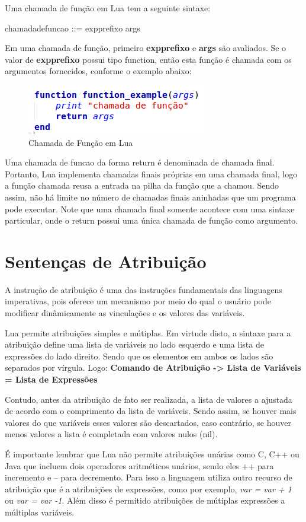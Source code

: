 \documentclass[
12pt, %
openright, %
oneside, %
a4paper, %
english, %
brazil, %
]{abntex2}
\begin{document}
Uma chamada de função em Lua tem a seguinte sintaxe:

  chamadadefuncao ::= expprefixo args

Em uma chamada de função, primeiro \textbf{expprefixo} e \textbf{args} são avaliados. Se o valor de \textbf{expprefixo} possui tipo function, então esta função é chamada com os argumentos fornecidos, conforme o exemplo abaixo:

\begin{figure}[H]
\centering
\includegraphics[width=0.5\linewidth]{imagens/function.png}
\caption{Chamada de Função em Lua}
\end{figure}

Uma chamada de funcao da forma return é denominada de chamada final. Portanto, Lua implementa chamadas finais próprias em uma chamada final, logo a função chamada reusa a entrada na pilha da função que a chamou. Sendo assim, não há limite no número de chamadas finais aninhadas que um programa pode executar. Note que uma chamada final somente acontece com uma sintaxe particular, onde o return possui uma única chamada de função como argumento.

\chapter{Sentenças de Atribuição}
A instrução de atribuição é uma das instruções fundamentais das linguagens imperativas, pois oferece um mecanismo por meio do qual o usuário pode modificar dinâmicamente as vinculações e os valores das variáveis.

Lua permite atribuições simples e mútiplas. Em virtude disto, a sintaxe para a atribuição define uma lista de variáveis no lado esquerdo e uma lista de expressões do lado direito. Sendo que os elementos em ambos os lados são separados por vírgula. Logo:
\textbf{Comando de Atribuição -> Lista de Variáveis = Lista de Expressões}

Contudo, antes da atribuição de fato ser realizada, a lista de valores a ajustada de acordo com o comprimento da lista de variáveis. Sendo assim, se houver mais valores do que variáveis esses valores são descartados, caso contrário, se houver menos valores a lista é completada com valores nulos (nil).

É importante lembrar que Lua não permite atribuições unárias como C, C++ ou Java que incluem dois operadores aritméticos unários, sendo eles ++ para incremento e -- para decremento. Para isso a linguagem utiliza outro recurso de atribuição que é a atribuições de expressões, como por exemplo, \textit{var = var + 1} ou \textit{var = var -1}. Além disso é permitido atribuições de mútiplas expressões a múltiplas variáveis.
\end{document}
